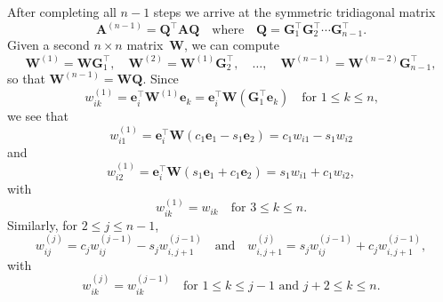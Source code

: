 \documentclass[12pt,a4paper]{article}
\newcommand{\bs}[1]{\boldsymbol{#1}}
\begin{document}
After completing all $n-1$ steps we arrive at the symmetric tridiagonal matrix
\[
\bs{A}^{(n-1)}=\bs{Q}^\top\bs{A}\bs{Q}\quad\text{where}\quad
\bs{Q}=\bs{G}_1^\top\bs{G}_2^\top\cdots\bs{G}_{n-1}^\top.
\]
Given a second $n\times n$ matrix~$\bs{W}$, we can compute
\[
\bs{W}^{(1)}=\bs{W}\bs{G}_1^\top,\quad
\bs{W}^{(2)}=\bs{W}^{(1)}\bs{G}_2^\top,\quad\ldots,\quad
\bs{W}^{(n-1)}=\bs{W}^{(n-2)}\bs{G}_{n-1}^\top,
\]
so that $\bs{W}^{(n-1)}=\bs{W}\bs{Q}$.  Since
\[
w^{(1)}_{ik}=\bs{e}_i^\top\bs{W}^{(1)}\bs{e}_k
	=\bs{e}_i^\top\bs{W}(\bs{G}_1^\top\bs{e}_k)
\quad\text{for $1\le k\le n$,}
\]
we see that
\[
w^{(1)}_{i1}=\bs{e}_i^\top\bs{W}(c_1\bs{e}_1-s_1\bs{e}_2)
	=c_1w_{i1}-s_1w_{i2}
\]
and
\[
w^{(1)}_{i2}=\bs{e}_i^\top\bs{W}(s_1\bs{e}_1+c_1\bs{e}_2)
	=s_1w_{i1}+c_1w_{i2},
\]
with
\[
w^{(1)}_{ik}=w_{ik}\quad\text{for $3\le k\le n$.}
\]
Similarly, for $2\le j\le n-1$,
\[
w^{(j)}_{ij}=c_jw^{(j-1)}_{ij}-s_jw^{(j-1)}_{i,j+1}
\quad\text{and}\quad
w^{(j)}_{i,j+1}=s_jw^{(j-1)}_{ij}+c_jw^{(j-1)}_{i,j+1},
\]
with
\[
w^{(j)}_{ik}=w^{(j-1)}_{ik}\quad\text{for $1\le k\le j-1$ and $j+2\le k\le n$.}
\]





























\end{document}
